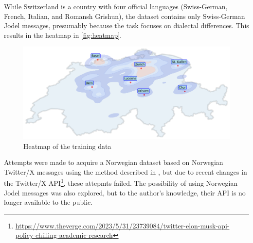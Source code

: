 While Switzerland is a country with four official languages (Swiss-German, French, Italian, and Romansh Grishun), the dataset contains only Swiss-German Jodel messages, presumably because the task focuses on dialectal differences. This results in the heatmap in \autoref{fig:heatmap}.

\begin{figure}
    \centering
    \includegraphics[width=\textwidth]{./figs/heatmap.png}
    \caption{Heatmap of the training data}
    \label{fig:heatmap}
\end{figure}

Attempts were made to acquire a Norwegian dataset based on Norwegian Twitter/X messages using the method described in \cite{ljubesicTweetGeoToolCollecting2016}, but due to recent changes in the Twitter/X API\footnote{\url{https://www.theverge.com/2023/5/31/23739084/twitter-elon-musk-api-policy-chilling-academic-research}}, these attepmts failed. The possibility of using Norwegian Jodel messages was also explored, but to the author's knowledge, their API is no longer available to the public.
